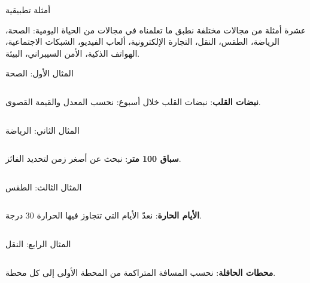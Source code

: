 \begin{frame}{أمثلة تطبيقية}
    \begin{tbox}{\faLaptopCode\quad عشرة أمثلة من مجالات مختلفة}
        نطبق ما تعلمناه في مجالات من الحياة اليومية:
        الصحة، الرياضة، الطقس، النقل، التجارة الإلكترونية، ألعاب الفيديو، الشبكات الاجتماعية، الهواتف الذكية، الأمن السيبراني، البيئة.
    \end{tbox}
\end{frame}

\begin{frame}[t]{المثال الأول: الصحة}
    \begin{columns}[T]
        {\small\textbf{نبضات القلب}: نبضات القلب خلال أسبوع: نحسب المعدل والقيمة القصوى.\par}
        \vspace{0.3cm}
    \end{columns}
\end{frame}

\begin{frame}[t]{المثال الثاني: الرياضة}
    \begin{columns}[T]
        {\small\textbf{سباق 100 متر}: نبحث عن أصغر زمن لتحديد الفائز.\par}
        \vspace{0.3cm}
    \end{columns}
\end{frame}

\begin{frame}[t]{المثال الثالث: الطقس}
    \begin{columns}[T]
        {\small\textbf{الأيام الحارة}: نعدّ الأيام التي تتجاوز فيها الحرارة 30 درجة.\par}
        \vspace{0.3cm}
    \end{columns}
\end{frame}

\begin{frame}[t]{المثال الرابع: النقل}
    \begin{columns}[T]
        {\small\textbf{محطات الحافلة}: نحسب المسافة المتراكمة من المحطة الأولى إلى كل محطة.\par}
        \vspace{0.3cm}
    \end{columns}
\end{frame}

